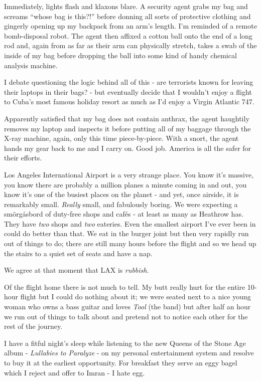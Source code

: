 \documentclass[a5paper,titlepage,11pt,draft]{book}
\begin{document}
Immediately, lights flash and klaxons blare.  A security agent grabs my bag and screams ``whose bag is this?!'' before donning all sorts of protective clothing and gingerly opening up my backpack from an arm's length.  I'm reminded of a remote bomb-disposal robot.  The agent then affixed a cotton ball onto the end of a long rod and, again from as far as their arm can physically stretch, takes a swab of the inside of my bag before dropping the ball into some kind of handy chemical analysis machine.

I debate questioning the logic behind all of this - are terrorists known for leaving their laptops in their bags? - but eventually decide that I wouldn't enjoy a flight to Cuba's most famous holiday resort as much as I'd enjoy a Virgin Atlantic 747.

Apparently satisfied that my bag does not contain anthrax, the agent haughtily removes my laptop and inspects it before putting all of my baggage through the X-ray machine, again, only this time piece-by-piece.  With a snort, the agent hands my gear back to me and I carry on.  Good job.  America is all the safer for their efforts.

Los Angeles International Airport is a very strange place.  You know it's massive, you know there are probably a million planes a minute coming in and out, you know it's one of the busiest places on the planet - and yet, once airside, it is remarkably small.  \emph{Really} small, and fabulously boring.  We were expecting a sm\"{o}rg\r{a}sbord of duty-free shops and caf\'{e}s - at least as many as Heathrow has.  They have \emph{two} shops and \emph{two} eateries.  Even the smallest airport I've ever been in could do better than that.  We eat in the burger joint but then very rapidly run out of things to do; there are still many hours before the flight and so we head up the stairs to a quiet set of seats and have a nap.

We agree at that moment that LAX is \emph{rubbish}.

Of the flight home there is not much to tell.  My butt really hurt for the entire 10-hour flight but I could do nothing about it; we were seated next to a nice young woman who owns a bass guitar and loves \emph{Tool} (the band) but after half an hour we run out of things to talk about and pretend not to notice each other for the rest of the journey.

I have a fitful night's sleep while listening to the new Queens of the Stone Age album - \emph{Lullabies to Paralyze} - on my personal entertainment system and resolve to buy it at the earliest opportunity.  For breakfast they serve an eggy bagel which I reject and offer to Imran - I hate egg.
\end{document}
